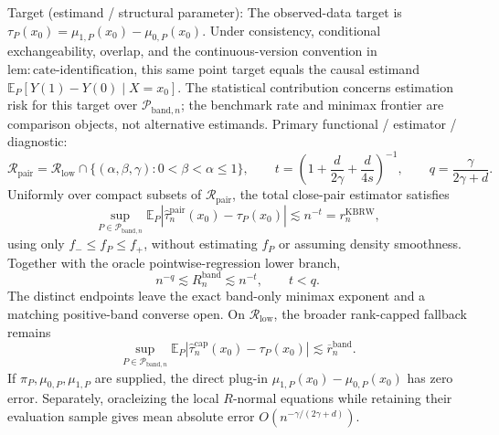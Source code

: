 \documentclass{article}
\begin{document}
Target (estimand / structural parameter): The observed-data target is \(\tau_P(x_0)=\mu_{1,P}(x_0)-\mu_{0,P}(x_0)\).  Under consistency, conditional exchangeability, overlap, and the continuous-version convention in \(\mathrm{lem:cate\mbox{-}identification}\), this same point target equals the causal estimand \(\mathbb E_P[Y(1)-Y(0)\mid X=x_0]\).  The statistical contribution concerns estimation risk for this target over \(\mathcal P_{\mathrm{band},n}\); the benchmark rate and minimax frontier are comparison objects, not alternative estimands.
Primary functional / estimator / diagnostic: \[
\mathcal R_{\mathrm{pair}}=\mathcal R_{\mathrm{low}}\cap
\{(\alpha,\beta,\gamma):0<\beta<\alpha\leq1\},
\qquad
t=\left(1+\frac d{2\gamma}+\frac d{4s}\right)^{-1},
\qquad
q=\frac{\gamma}{2\gamma+d}.
\]
Uniformly over compact subsets of \(\mathcal R_{\mathrm{pair}}\), the total close-pair estimator satisfies
\[
\sup_{P\in\mathcal P_{\mathrm{band},n}}
\mathbb E_P\left|\widehat\tau_n^{\mathrm{pair}}(x_0)-\tau_P(x_0)\right|
\lesssim n^{-t}=r_n^{\mathrm{KBRW}},
\]
using only \(f_-\leq f_P\leq f_+\), without estimating \(f_P\) or assuming density smoothness.  Together with the oracle pointwise-regression lower branch,
\[
n^{-q}\lesssim R_n^{\mathrm{band}}\lesssim n^{-t},
\qquad t<q.
\]
The distinct endpoints leave the exact band-only minimax exponent and a matching positive-band converse open.  On \(\mathcal R_{\mathrm{low}}\), the broader rank-capped fallback remains
\[
\sup_{P\in\mathcal P_{\mathrm{band},n}}
\mathbb E_P\left|\widehat\tau_n^{\mathrm{cap}}(x_0)-\tau_P(x_0)\right|
\lesssim\overline r_n^{\mathrm{band}}.
\]
If \(\pi_P,\mu_{0,P},\mu_{1,P}\) are supplied, the direct plug-in \(\mu_{1,P}(x_0)-\mu_{0,P}(x_0)\) has zero error.  Separately, oracleizing the local \(R\)-normal equations while retaining their evaluation sample gives mean absolute error \(O(n^{-\gamma/(2\gamma+d)})\).
\end{document}
